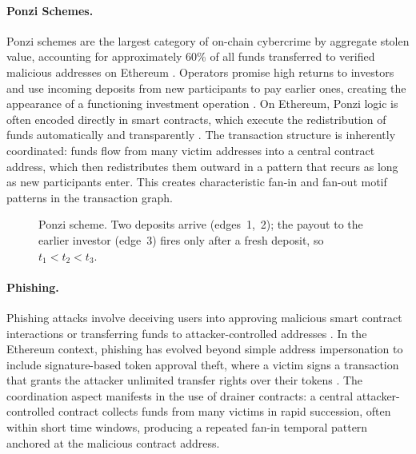 \documentclass{thesisclass}
\begin{document}
\paragraph{Ponzi Schemes.}
Ponzi schemes are the largest category of on-chain cybercrime by aggregate stolen value, accounting for approximately 60\% of all funds transferred to verified malicious addresses on Ethereum \citep{hornuf2025cybercrime}. Operators promise high returns to investors and use incoming deposits from new participants to pay earlier ones, creating the appearance of a functioning investment operation \citep{bartoletti2020smart}. On Ethereum, Ponzi logic is often encoded directly in smart contracts, which execute the redistribution of funds automatically and transparently \citep{chen2020survey}. The transaction structure is inherently coordinated: funds flow from many victim addresses into a central contract address, which then redistributes them outward in a pattern that recurs as long as new participants enter. This creates characteristic fan-in and fan-out motif patterns in the transaction graph.

\begin{figure}[ht]
  \centering
  \caption[Ponzi temporal motif]{Ponzi scheme. Two deposits arrive (edges~1,~2);
    the payout to the earlier investor (edge~3) fires only after a fresh deposit,
    so $t_1 < t_2 < t_3$.}
  \label{fig:motif-ponzi}
\end{figure}

\paragraph{Phishing.}
Phishing attacks involve deceiving users into approving malicious smart contract interactions or transferring funds to attacker-controlled addresses \citep{chen2020phishing}. In the Ethereum context, phishing has evolved beyond simple address impersonation to include signature-based token approval theft, where a victim signs a transaction that grants the attacker unlimited transfer rights over their tokens \citep{hornuf2025cybercrime}. The coordination aspect manifests in the use of drainer contracts: a central attacker-controlled contract collects funds from many victims in rapid succession, often within short time windows, producing a repeated fan-in temporal pattern anchored at the malicious contract address.
\end{document}
